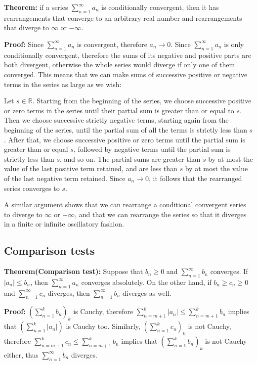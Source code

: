 \documentclass{article}
\begin{document}
\textbf{Theorem:} if a series $\sum_{n=1}^{\infty}{a_n}$ is conditionally convergent, then it has rearrangements that converge to an arbitrary real number and rearrangements that diverge to $\infty$ or $-\infty$.

\textbf{Proof:} Since $\sum_{n=1}^{\infty}{a_n}$ is convergent, therefore $a_n\to 0$. Since $\sum_{n=1}^{\infty}{a_n}$ is only conditionally convergent, therefore the sums of its negative and positive parts are both divergent, otherwise the whole series would diverge if only one of them converged. This means that we can make sums of successive positive or negative terms in the series as large as we wish:

Let $s\in \mathbb{R}$. Starting from the beginning of the series, we choose successive positive or zero terms in the series until their partial sum is greater than or equal to $s$. Then we choose successive strictly negative terms, starting again from the beginning of the series, until the partial sum of all the terms is strictly less than $s$. After that, we choose successive positive or zero terms until the partial sum is greater than or equal $s$, followed by negative terms until the partial sum is strictly less than $s$, and so on. The partial sums are greater than $s$ by at most the value of the last positive term retained, and are less than $s$ by at most the value of the last negative term retained. Since $a_n\to 0$, it follows that the rearranged series converges to $s$. 

A similar argument shows that we can rearrange a conditional convergent series to diverge to $\infty$ or $-\infty$, and that we can rearrange the series so that it diverges in a finite or infinite oscillatory fashion.

\subsection{Comparison tests}

\textbf{Theorem(Comparison test):} Suppose that $b_n\geq 0$ and $\sum_{n=1}^{\infty}{b_n}$ converges. If $|a_n|\leq b_n$, then $\sum_{n=1}^{\infty}{a_n}$ converges absolutely. 
On the other hand, if $b_n\geq c_n \geq 0$ and $\sum_{n=1}^{\infty}{c_n}$ diverges, then $\sum_{n=1}^{\infty}{b_n}$ diverges as well.

\textbf{Proof:} $(\sum_{n=1}^{k}{b_n})_k$ is Cauchy, therefore $\sum_{n=m+1}^{k}{|a_n|}\leq \sum_{n=m+1}^{k}{b_n}$ implies that $(\sum_{n=1}^{k}{|a_n|})$ is Cauchy too. 
Similarly, $(\sum_{n=1}^{k}{c_n})_k$ is not Cauchy, therefore $\sum_{n=m+1}^{k}{c_n}\leq \sum_{n=m+1}^{k}{b_n}$ implies that $(\sum_{n=1}^{k}{b_n})_k$ is not Cauchy either, thus $\sum_{n=1}^{\infty}{b_n}$ diverges.
\end{document}
